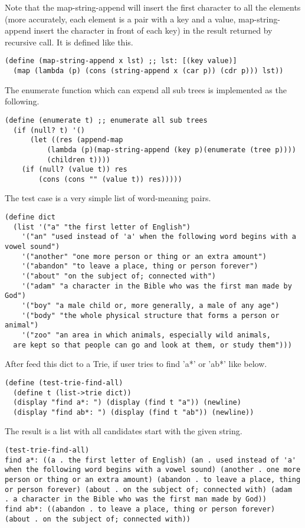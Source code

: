 \documentclass{article}
\begin{document}
Note that the map-string-append will insert the first character to all
the elements (more accurately, each element is a pair with a key and a
value, map-string-append insert the character in front of each key) in
the result returned by recursive call. It is defined like this.

\begin{lstlisting}
(define (map-string-append x lst) ;; lst: [(key value)]
  (map (lambda (p) (cons (string-append x (car p)) (cdr p))) lst))
\end{lstlisting}

The enumerate function which can expend all sub trees is implemented
as the following.

\begin{lstlisting}
(define (enumerate t) ;; enumerate all sub trees
  (if (null? t) '()
      (let ((res (append-map 
		  (lambda (p)(map-string-append (key p)(enumerate (tree p))))
		  (children t))))
	(if (null? (value t)) res
	    (cons (cons "" (value t)) res)))))
\end{lstlisting}

The test case is a very simple list of word-meaning pairs.

\begin{lstlisting}
(define dict 
  (list '("a" "the first letter of English")
	'("an" "used instead of 'a' when the following word begins with a vowel sound")
	'("another" "one more person or thing or an extra amount")
	'("abandon" "to leave a place, thing or person forever")
	'("about" "on the subject of; connected with")
	'("adam" "a character in the Bible who was the first man made by God")
	'("boy" "a male child or, more generally, a male of any age")
	'("body" "the whole physical structure that forms a person or animal")
	'("zoo" "an area in which animals, especially wild animals,
  are kept so that people can go and look at them, or study them")))
\end{lstlisting}

After feed this dict to a Trie, if user tries to find 'a*' or 'ab*'
like below.

\begin{lstlisting}
(define (test-trie-find-all)
  (define t (list->trie dict))
  (display "find a*: ") (display (find t "a")) (newline)
  (display "find ab*: ") (display (find t "ab")) (newline))
\end{lstlisting}

The result is a list with all candidates start with the given string.
\begin{verbatim}
(test-trie-find-all)
find a*: ((a . the first letter of English) (an . used instead of 'a' 
when the following word begins with a vowel sound) (another . one more 
person or thing or an extra amount) (abandon . to leave a place, thing 
or person forever) (about . on the subject of; connected with) (adam
. a character in the Bible who was the first man made by God))
find ab*: ((abandon . to leave a place, thing or person forever)
(about . on the subject of; connected with))
\end{verbatim}
\end{document}
